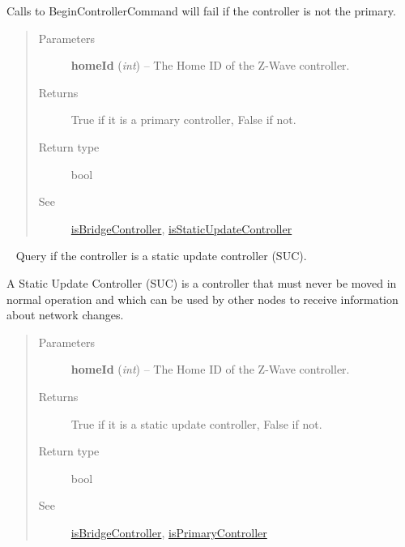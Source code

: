 \documentclass[letterpaper,10pt,english]{sphinxmanual}
\begin{document}
\begin{fulllineitems}
\begin{fulllineitems}
Calls to BeginControllerCommand will fail if the controller is not the primary.
\begin{quote}\begin{description}
\item[{Parameters}] \leavevmode
\textbf{homeId} (\emph{int}) -- The Home ID of the Z-Wave controller.

\item[{Returns}] \leavevmode
True if it is a primary controller, False if not.

\item[{Return type}] \leavevmode
bool

\item[{See}] \leavevmode
{\hyperref[libopenzwave:isbridgecontroller]{isBridgeController}}, {\hyperref[libopenzwave:isstaticupdatecontroller]{isStaticUpdateController}}

\end{description}\end{quote}

\end{fulllineitems}


\begin{fulllineitems}
\label{libopenzwave:libopenzwave.PyManager.isStaticUpdateController}~\label{libopenzwave:isstaticupdatecontroller}
Query if the controller is a static update controller (SUC).

A Static Update Controller (SUC) is a controller that must never be moved in
normal operation and which can be used by other nodes to receive information
about network changes.
\begin{quote}\begin{description}
\item[{Parameters}] \leavevmode
\textbf{homeId} (\emph{int}) -- The Home ID of the Z-Wave controller.

\item[{Returns}] \leavevmode
True if it is a static update controller, False if not.

\item[{Return type}] \leavevmode
bool

\item[{See}] \leavevmode
{\hyperref[libopenzwave:isbridgecontroller]{isBridgeController}}, {\hyperref[libopenzwave:isprimarycontroller]{isPrimaryController}}


\end{description}
\end{quote}
\end{fulllineitems}
\end{fulllineitems}
\end{document}
